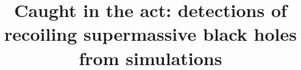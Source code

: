 \documentclass[twocolumn]{aastex631}
\begin{document}
\title{Caught in the act: detections of recoiling supermassive black holes from simulations}


\end{document}

